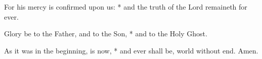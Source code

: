 ﻿\item For his mercy is confirmed upon us: * and the truth of the Lord remaineth for ever.
\item Glory be to the Father, and to the Son, * and to the Holy Ghost.
\item As it was in the beginning, is now, * and ever shall be, world without end. Amen.